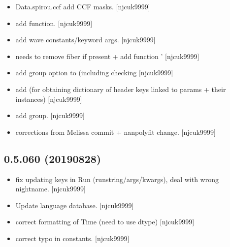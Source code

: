 \documentclass[a4paper,10pt,english]{report}
\begin{document}
\begin{itemize}
\item {} 
Data.spirou.ccf \sphinxhyphen{} add CCF masks. {[}njcuk9999{]}

\item {} 
 \sphinxhyphen{} add  function.
{[}njcuk9999{]}

\item {} 
 \sphinxhyphen{} add wave constants/keyword args. {[}njcuk9999{]}

\item {} 
 \sphinxhyphen{}  needs to remove fiber
if present + add function ’ {[}njcuk9999{]}

\item {} 
 \sphinxhyphen{} add group option to 
(including checking  {[}njcuk9999{]}

\item {} 
 \sphinxhyphen{} add  (for
obtaining dictionary of header keys linked to params + their
instances) {[}njcuk9999{]}

\item {} 
 \sphinxhyphen{} add group. {[}njcuk9999{]}

\item {} 
 \sphinxhyphen{} corrections from Melissa commit + nanpolyfit
change. {[}njcuk9999{]}

\end{itemize}


\subsection{0.5.060 (2019\sphinxhyphen{}08\sphinxhyphen{}28)}
\label{\detokenize{misc/changelog:id101}}\begin{itemize}
\item {} 
 \sphinxhyphen{} fix updating keys in Run
(runstring/args/kwargs), deal with wrong nightname. {[}njcuk9999{]}

\item {} 
Update language database. {[}njcuk9999{]}

\item {} 
 \sphinxhyphen{} correct formatting of Time (need to use dtype)
{[}njcuk9999{]}

\item {} 
 \sphinxhyphen{} correct typo in
constants. {[}njcuk9999{]}

\end{itemize}
\end{document}

